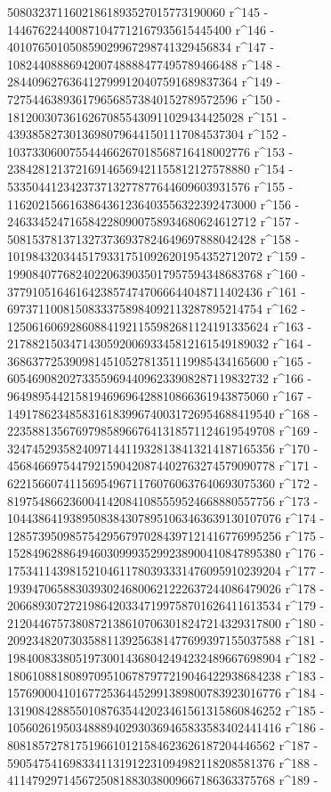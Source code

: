        50803237116021861893527015773190060 r^145 - 
       144676224400871047712167935615445400 r^146 - 
       401076501050859029967298741329456834 r^147 - 
       1082440888694200748888477495789466488 r^148 - 
       2844096276364127999120407591689837364 r^149 - 
       7275446389361796568573840152789572596 r^150 - 
       18120030736162670855430911029434425028 r^151 - 
       43938582730136980796441501117084537304 r^152 - 
       103733060075544466267018568716418002776 r^153 - 
       238428121372169146569421155812127578880 r^154 - 
       533504412342373713277877644609603931576 r^155 - 
       1162021566163864361236403556322392473000 r^156 - 
       2463345247165842280900758934680624612712 r^157 - 
       5081537813713273736937824649697888042428 r^158 - 
       10198432034451793317510926201954352712072 r^159 - 
       19908407768240220639035017957594348683768 r^160 - 
       37791051646164238574747066644048711402436 r^161 - 
       69737110081508333758984092113287895214754 r^162 - 
       125061606928608841921155982681124191335624 r^163 - 
       217882150347143059200693345812161549189032 r^164 - 
       368637725390981451052781351119985434165600 r^165 - 
       605469082027335596944096233908287119832732 r^166 - 
       964989544215819469696428810866361943875060 r^167 - 
       1491786234858316183996740031726954688419540 r^168 - 
       2235881356769798589667641318571124619549708 r^169 - 
       3247452935824097144119328138413214187165356 r^170 - 
       4568466975447921590420874402763274579090778 r^171 - 
       6221566074115695496711760760637640693075360 r^172 - 
       8197548662360041420841085559524668880557756 r^173 - 
       10443864193895083843078951063463639130107076 r^174 - 
       12857395098575429567970284397121416776995256 r^175 - 
       15284962886494603099935299238900410847895380 r^176 - 
       17534114398152104611780393331476095910239204 r^177 - 
       19394706588303930246800621222637244086479026 r^178 - 
       20668930727219864203347199758701626411613534 r^179 - 
       21204467573808721386107063018247214329317800 r^180 - 
       20923482073035881139256381477699397155037588 r^181 - 
       19840083380519730014368042494232489667698904 r^182 - 
       18061088180897095106787977219046422938684238 r^183 - 
       15769000410167725364452991389800783923016776 r^184 - 
       13190842885501087635442023461561315860846252 r^185 - 
       10560261950348889402930369465833583402441416 r^186 - 
       8081857278175196610121584623626187204446562 r^187 - 
       5905475416983341131912231094982118208581376 r^188 - 
       4114792971456725081883038009667186363375768 r^189 - 
